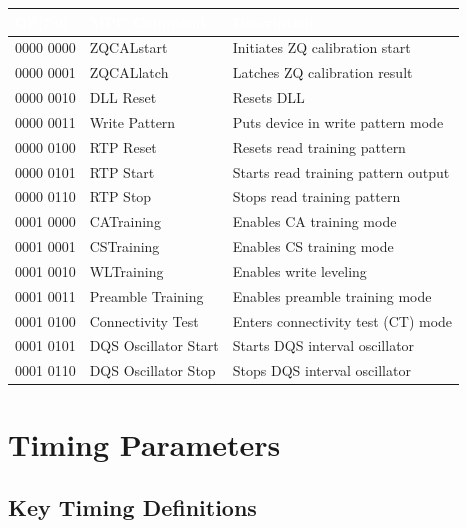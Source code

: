 \documentclass[10pt,a4paper,twoside]{article}
\newcommand{\thd}[1]{\cellcolor{navyblue}\textcolor{white}{\textbf{#1}}}
\newcommand{\trow}{\rowcolor{lightgray}}
\newcommand{\talt}{\rowcolor{skyblue!30}}
\begin{document}
\begin{center}
\begin{tabularx}{0.88\linewidth}{@{} l l X @{}}
\toprule
\thd{OP[7:0]} & \thd{MPC Command} & \thd{Description} \\
\midrule
\trow 0000 0000 & ZQCALstart & Initiates ZQ calibration start \\
\talt 0000 0001 & ZQCALlatch & Latches ZQ calibration result \\
\trow 0000 0010 & DLL Reset & Resets DLL \\
\talt 0000 0011 & Write Pattern & Puts device in write pattern mode \\
\trow 0000 0100 & RTP Reset & Resets read training pattern \\
\talt 0000 0101 & RTP Start & Starts read training pattern output \\
\trow 0000 0110 & RTP Stop & Stops read training pattern \\
\talt 0001 0000 & CATraining & Enables CA training mode \\
\trow 0001 0001 & CSTraining & Enables CS training mode \\
\talt 0001 0010 & WLTraining & Enables write leveling \\
\trow 0001 0011 & Preamble Training & Enables preamble training mode \\
\talt 0001 0100 & Connectivity Test & Enters connectivity test (CT) mode \\
\trow 0001 0101 & DQS Oscillator Start & Starts DQS interval oscillator \\
\talt 0001 0110 & DQS Oscillator Stop & Stops DQS interval oscillator \\
\bottomrule
\end{tabularx}
\end{center}

\section{Timing Parameters}

\subsection{Key Timing Definitions}
\end{document}
